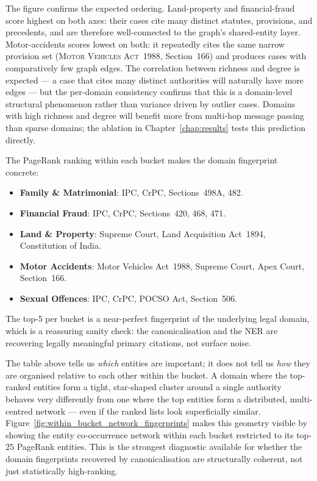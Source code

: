 The figure confirms the expected ordering. Land-property and financial-fraud
score highest on both axes: their cases cite many distinct statutes, provisions,
and precedents, and are therefore well-connected to the graph's shared-entity
layer. Motor-accidents scores lowest on both: it repeatedly cites the same narrow
provision set (\textsc{Motor Vehicles Act~1988}, Section~166) and produces cases
with comparatively few graph edges. The correlation between richness and degree is
expected --- a case that cites many distinct authorities will naturally have more
edges --- but the per-domain consistency confirms that this is a domain-level
structural phenomenon rather than variance driven by outlier cases. Domains with
high richness and degree will benefit more from multi-hop message passing than
sparse domains; the ablation in Chapter~\ref{chap:results} tests this prediction
directly.

The PageRank ranking within each bucket makes the domain fingerprint concrete:

\begin{itemize}
  \item \textbf{Family \& Matrimonial}: IPC, CrPC, Sections~498A, 482.
  \item \textbf{Financial Fraud}: IPC, CrPC, Sections~420, 468, 471.
  \item \textbf{Land \& Property}: Supreme Court, Land Acquisition
    Act~1894, Constitution of India.
  \item \textbf{Motor Accidents}: Motor Vehicles Act~1988, Supreme Court,
    Apex Court, Section~166.
  \item \textbf{Sexual Offences}: IPC, CrPC, POCSO Act, Section~506.
\end{itemize}

The top-5 per bucket is a near-perfect fingerprint of the underlying
legal domain, which is a reassuring sanity check: the canonicalisation
and the NER are recovering legally meaningful primary citations, not
surface noise.

The table above tells us \emph{which} entities are important; it does not tell
us \emph{how} they are organised relative to each other within the bucket.
A domain where the top-ranked entities form a tight, star-shaped cluster around
a single authority behaves very differently from one where the top entities form
a distributed, multi-centred network --- even if the ranked lists look superficially
similar. Figure~\ref{fig:within_bucket_network_fingerprints} makes this geometry
visible by showing the entity co-occurrence network within each bucket restricted
to its top-25 PageRank entities. This is the strongest diagnostic available for
whether the domain fingerprints recovered by canonicalisation are structurally
coherent, not just statistically high-ranking.

